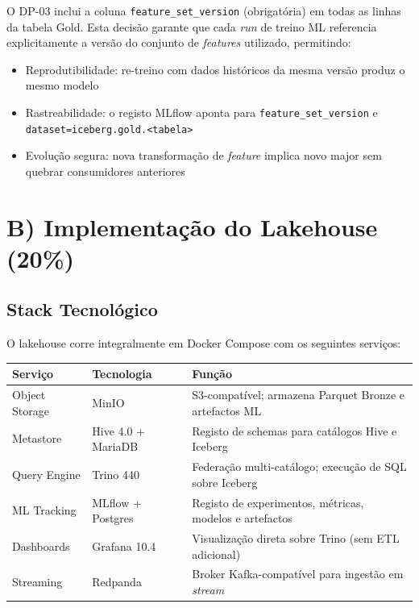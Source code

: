 \documentclass[11pt,a4paper]{article}
\begin{document}
O DP-03 inclui a coluna \texttt{feature\_set\_version} (obrigatória) em todas as linhas da tabela Gold. Esta decisão garante que cada \textit{run} de treino ML referencia explicitamente a versão do conjunto de \textit{features} utilizado, permitindo:
\begin{itemize}[leftmargin=*,noitemsep]
  \item Reprodutibilidade: re-treino com dados históricos da mesma versão produz o mesmo modelo
  \item Rastreabilidade: o registo MLflow aponta para \texttt{feature\_set\_version} e \texttt{dataset=iceberg.gold.<tabela>}
  \item Evolução segura: nova transformação de \textit{feature} implica novo major sem quebrar consumidores anteriores
\end{itemize}

\section{B) Implementação do Lakehouse (20\%)}

\subsection{Stack Tecnológico}

O lakehouse corre integralmente em Docker Compose com os seguintes serviços:

\begin{table}[h!]
\centering
\begin{tabularx}{\linewidth}{llX}
\toprule
\textbf{Serviço} & \textbf{Tecnologia} & \textbf{Função} \\
\midrule
Object Storage & MinIO & S3-compatível; armazena Parquet Bronze e artefactos ML \\
Metastore & Hive 4.0 + MariaDB & Registo de schemas para catálogos Hive e Iceberg \\
Query Engine & Trino 440 & Federação multi-catálogo; execução de SQL sobre Iceberg \\
ML Tracking & MLflow + Postgres & Registo de experimentos, métricas, modelos e artefactos \\
Dashboards & Grafana 10.4 & Visualização direta sobre Trino (sem ETL adicional) \\
Streaming & Redpanda & Broker Kafka-compatível para ingestão em \textit{stream} \\
\bottomrule
\end{tabularx}
\end{table}
\end{document}
